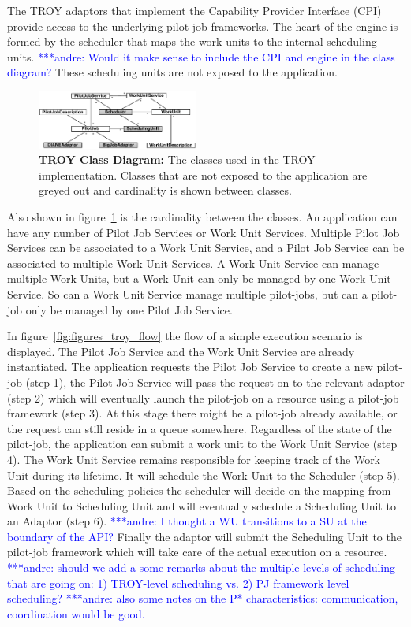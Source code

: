 \documentclass[conference,final]{IEEEtran}
\newcommand{\alnote}[1]{ {\textcolor{blue} { ***andre: #1 }}}
\newcommand{\alnote}[1]{}
\begin{document}
The TROY adaptors that implement the Capability Provider Interface
(CPI) provide access to the underlying pilot-job frameworks. The heart
of the engine is formed by the scheduler that maps the work units to
the internal scheduling units.  \alnote{Would it make sense to include
  the CPI and engine in the class diagram?}  These scheduling units
are not exposed to the application.

\begin{figure}[t]
	\centering
		\includegraphics[width=0.47\textwidth]{figures/troy_classes.pdf}
                \caption{\textbf{TROY Class Diagram:} The classes used
                  in the TROY implementation. Classes that are not
                  exposed to the application are greyed out and
                  cardinality is shown between classes.  }
	\label{fig:figures_troy_classes}
\end{figure}

Also shown in figure~\ref{fig:figures_troy_classes} is the cardinality between
the classes. An application can have any number of Pilot Job Services or Work
Unit Services. Multiple Pilot Job Services can be associated to a Work Unit
Service, and a Pilot Job Service can be associated to multiple Work Unit
Services. A Work Unit Service can manage multiple Work Units, but a Work Unit
can only be managed by one Work Unit Service. So can a Work Unit Service manage
multiple pilot-jobs, but can a pilot-job only be managed by one Pilot Job
Service.

In figure~\ref{fig:figures_troy_flow} the flow of a simple execution scenario is
displayed. The Pilot Job Service and the Work Unit Service are already
instantiated. The application requests the Pilot Job Service to create a new
pilot-job (step 1), the Pilot Job Service will pass the request on to the
relevant adaptor (step 2) which will eventually launch the pilot-job on a
resource using a pilot-job framework (step 3). At this stage there might be a
pilot-job already available, or the request can still reside in a queue
somewhere. Regardless of the state of the pilot-job, the application can submit
a work unit to the Work Unit Service (step 4). The Work Unit Service remains
responsible for keeping track of the Work Unit during its lifetime. It will
schedule the Work Unit to the Scheduler (step 5). Based on the scheduling
policies the scheduler will decide on the mapping from Work Unit to Scheduling
Unit and will eventually schedule a Scheduling Unit to an Adaptor (step 6). 
\alnote{I thought a WU transitions to a SU at the boundary of the API?}
Finally the adaptor will submit the Scheduling Unit to the pilot-job framework
which will take care of the actual execution on a resource. \alnote{should we 
add a some remarks about the multiple levels of scheduling that are going on:
1) TROY-level scheduling vs. 2) PJ framework level scheduling?} \alnote{also 
some notes on the P* characteristics: communication, coordination would be 
good.}
\end{document}
